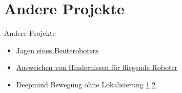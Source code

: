\documentclass[aspectratio=169]{beamer}
\begin{document}
  \section{Andere Projekte}
  \begin{frame}{Andere Projekte}
  	\begin{itemize}
  		\item \href{https://www.youtube.com/watch?v=fL3YCIPxuhM&feature=youtu.be}{Jagen eines Beuteroboters}
  		\item \href{https://youtu.be/hNsP6-K3Hn4?t=40}{Ausweichen von Hindernissen für fliegende Roboter}
  		\item Deepmind Bewegung ohne Lokalisierung \href{https://www.youtube.com/watch?v=nMR5mjCFZCw}{\underline{1}} \href{https://youtu.be/0xo1Ldx3L5Q}{\underline{2}}
  	\end{itemize}
  \end{frame}
  
\end{document}
